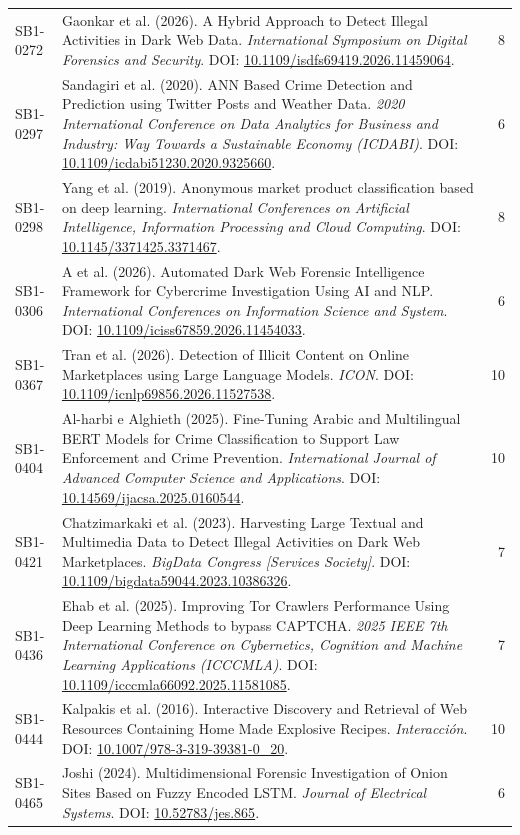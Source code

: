 \begin{small}
\begin{longtable}{lp{11.2cm}r}
SB1-0272 & Gaonkar et al. (2026). A Hybrid Approach to Detect Illegal Activities in Dark Web Data. \textit{International Symposium on Digital Forensics and Security}. DOI: \url{10.1109/isdfs69419.2026.11459064}. & 8 \\
SB1-0297 & Sandagiri et al. (2020). ANN Based Crime Detection and Prediction using Twitter Posts and Weather Data. \textit{2020 International Conference on Data Analytics for Business and Industry: Way Towards a Sustainable Economy (ICDABI)}. DOI: \url{10.1109/icdabi51230.2020.9325660}. & 6 \\
SB1-0298 & Yang et al. (2019). Anonymous market product classification based on deep learning. \textit{International Conferences on Artificial Intelligence, Information Processing and Cloud Computing}. DOI: \url{10.1145/3371425.3371467}. & 8 \\
SB1-0306 & A et al. (2026). Automated Dark Web Forensic Intelligence Framework for Cybercrime Investigation Using AI and NLP. \textit{International Conferences on Information Science and System}. DOI: \url{10.1109/iciss67859.2026.11454033}. & 6 \\
SB1-0367 & Tran et al. (2026). Detection of Illicit Content on Online Marketplaces using Large Language Models. \textit{ICON}. DOI: \url{10.1109/icnlp69856.2026.11527538}. & 10 \\
SB1-0404 & Al-harbi e Alghieth (2025). Fine-Tuning Arabic and Multilingual BERT Models for Crime Classification to Support Law Enforcement and Crime Prevention. \textit{International Journal of Advanced Computer Science and Applications}. DOI: \url{10.14569/ijacsa.2025.0160544}. & 10 \\
SB1-0421 & Chatzimarkaki et al. (2023). Harvesting Large Textual and Multimedia Data to Detect Illegal Activities on Dark Web Marketplaces. \textit{BigData Congress [Services Society]}. DOI: \url{10.1109/bigdata59044.2023.10386326}. & 7 \\
SB1-0436 & Ehab et al. (2025). Improving Tor Crawlers Performance Using Deep Learning Methods to bypass CAPTCHA. \textit{2025 IEEE 7th International Conference on Cybernetics, Cognition and Machine Learning Applications (ICCCMLA)}. DOI: \url{10.1109/icccmla66092.2025.11581085}. & 7 \\
SB1-0444 & Kalpakis et al. (2016). Interactive Discovery and Retrieval of Web Resources Containing Home Made Explosive Recipes. \textit{Interacción}. DOI: \url{10.1007/978-3-319-39381-0_20}. & 10 \\
SB1-0465 & Joshi (2024). Multidimensional Forensic Investigation of Onion Sites Based on Fuzzy Encoded LSTM. \textit{Journal of Electrical Systems}. DOI: \url{10.52783/jes.865}. & 6 \\

\end{longtable}
\end{small}
